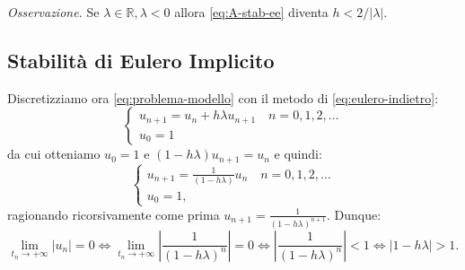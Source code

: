 \textit{Osservazione.} Se $\lambda \in \mathbb{R} ,\lambda < 0$ allora \eqref{eq:A-stab-ee} diventa $h< 2/| \lambda |$.

\subsection{Stabilità di Eulero Implicito}
Discretizziamo ora \eqref{eq:problema-modello} con il metodo di \eqref{eq:eulero-indietro}:
\begin{equation*}
\begin{cases}
u_{n+1} =u_{n} +h\lambda u_{n+1} \quad n=0,1,2,\dotsc \\
u_{0} =1
\end{cases}
\end{equation*}
da cui otteniamo $u_{0} =1$ e $( 1-h\lambda ) u_{n+1} =u_{n}$ e quindi:
\begin{equation*}
\begin{cases}
u_{n+1} =\frac{1}{( 1-h\lambda )} u_{n} \quad n=0,1,2,\dotsc \\
u_{0} =1,
\end{cases}
\end{equation*}
ragionando ricorsivamente come prima $u_{n+1} =\frac{1}{( 1-h\lambda )^{n+1}}$. Dunque:
\begin{equation*}
\lim _{t_{n}\rightarrow +\infty }| u_{n}| =0\Leftrightarrow \lim _{t_{n}\rightarrow +\infty }\left| \frac{1}{( 1-h\lambda )^{n}}\right| =0\Leftrightarrow \left| \frac{1}{( 1-h\lambda )^{n}}\right| < 1\Leftrightarrow | 1-h\lambda |  >1.
\end{equation*}

